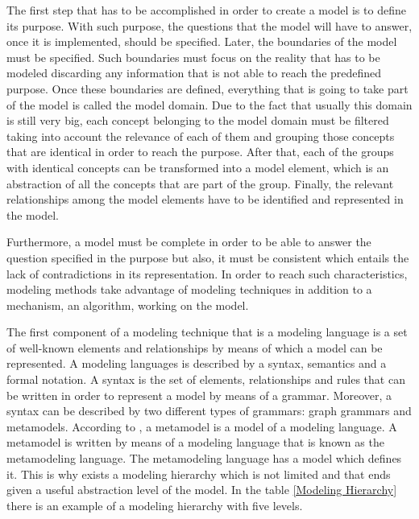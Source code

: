 The first step that has to be accomplished in order to create a model is to define its purpose. With such purpose, the questions that the model will have to answer, once it is implemented, should be specified. Later, the boundaries of the model must be specified. Such boundaries must focus on the reality that has to be modeled discarding any information that is not able to reach the predefined purpose. Once these boundaries are defined, everything that is going to take part of the model is called the model domain. Due to the fact that usually this domain is still very big, each concept belonging to the model domain must be filtered taking into account the relevance of each of them and grouping those concepts that are identical in order to reach the purpose. After that, each of the groups with identical concepts can be transformed into a model element, which is an abstraction of all the concepts that are part of the group. Finally, the relevant relationships among the model elements have to be identified and represented in the model.

Furthermore, a model must be complete in order to be able to answer the question specified in the purpose but also, it must be consistent which entails the lack of contradictions in its representation. In order to reach such characteristics, modeling methods take advantage of modeling techniques in addition to a mechanism, an algorithm, working on the model.

The first component of a modeling technique that is a modeling language is a set of well-known elements and relationships by means of which a model can be represented. A modeling languages is described by a syntax, semantics and a formal notation. A syntax is the set of elements, relationships and rules that can be written in order to represent a model by means of a grammar. Moreover, a syntax can be described by two different types of grammars: graph grammars and metamodels. According to \cite{metamodelwebsite}, a metamodel is a model of a modeling language. A metamodel is written by means of a modeling language that is known as the metamodeling language. The metamodeling language has a model which defines it. This is why exists a modeling hierarchy which is not limited and that ends given a useful abstraction level of the model. In the table \ref{Modeling Hierarchy} there is an example of a modeling hierarchy with five levels.

